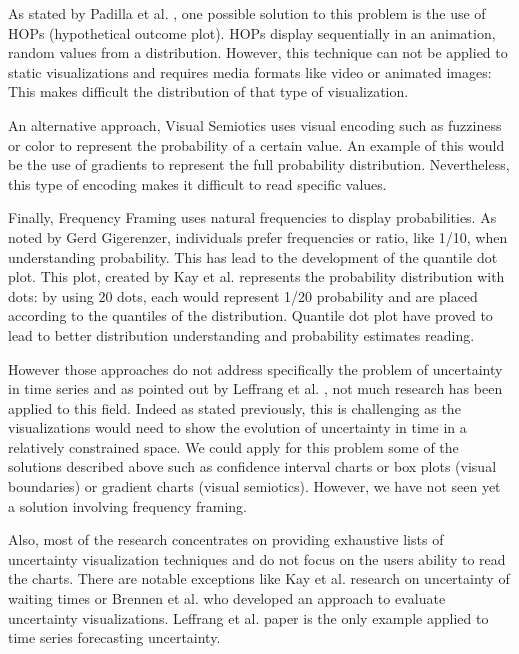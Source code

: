 \documentclass[a4paper,3p,sort&compress]{elsarticle}
\begin{document}
As stated by Padilla et al. \cite{padilla_uncertainty_2021}, one possible solution to this problem is the use of HOPs 
(hypothetical outcome plot). HOPs display 
sequentially in an animation, random values from a distribution. However, this technique can not be 
applied to static visualizations and requires media formats like video or animated images: This makes difficult the distribution 
of that type of visualization.

An alternative approach, Visual Semiotics uses visual encoding such as fuzziness or color to represent 
the probability of a certain value. An example of this would be the use of gradients to represent the 
full probability distribution. Nevertheless, this type of encoding makes it difficult to read specific 
values. 

Finally, Frequency Framing uses natural frequencies to display probabilities. As noted by Gerd 
Gigerenzer, individuals prefer frequencies or ratio, like 1/10, when understanding probability. This has 
lead to the development of the quantile dot plot. This plot, created by Kay et al. 
\cite{2016-when-ish-is-my-bus} 
represents 
the probability distribution with dots: by using 20 dots, each would represent 1/20 probability 
and are placed according 
to the quantiles of the distribution. Quantile dot plot have proved to lead to better distribution 
understanding and probability estimates reading. 

However those approaches do not address specifically the problem of uncertainty in time series 
and as pointed out by Leffrang et al. \cite{leffrang_should_2021}, not much research has been applied to this 
field. Indeed as stated previously, this is challenging as the visualizations would need to show the evolution 
of uncertainty in time in a relatively constrained space. We could apply for this problem some of the solutions 
described above such as confidence interval charts or 
box plots (visual boundaries) or gradient charts (visual semiotics). However, we have not seen yet a solution involving 
frequency framing. 

Also, most of the research concentrates on providing exhaustive lists of uncertainty visualization techniques and do not 
focus on the users ability to read the charts. There are notable exceptions like Kay et al. \cite{2016-when-ish-is-my-bus}
research on uncertainty of waiting times or Brennen et al. \cite{brennen_instrument_2018} who developed an 
approach to evaluate uncertainty visualizations.
Leffrang et al. \cite{leffrang_should_2021} paper is the only example applied to time series forecasting uncertainty.
\end{document}
